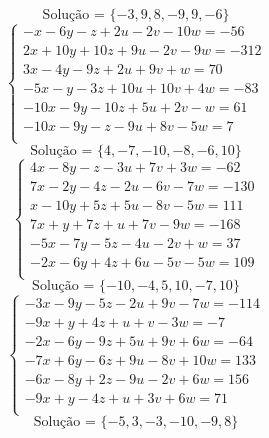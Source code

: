 \documentclass[12pt,oneside,a4paper]{article}
\begin{document}
\begin{equation*}
\text{Solução = }\{-3,9,8,-9,9,-6\}
\end{equation*}
\vspace{\baselineskip}
\begin{equation*}
\begin{cases}
-x-6y-z+2u-2v-10w=-56 \\
2x+10y+10z+9u-2v-9w=-312 \\
3x-4y-9z+2u+9v+w=70 \\
-5x-y-3z+10u+10v+4w=-83 \\
-10x-9y-10z+5u+2v-w=61 \\
-10x-9y-z-9u+8v-5w=7 \\
\end{cases}
\end{equation*}
\begin{equation*}
\text{Solução = }\{4,-7,-10,-8,-6,10\}
\end{equation*}
\vspace{\baselineskip}
\begin{equation*}
\begin{cases}
4x-8y-z-3u+7v+3w=-62 \\
7x-2y-4z-2u-6v-7w=-130 \\
x-10y+5z+5u-8v-5w=111 \\
7x+y+7z+u+7v-9w=-168 \\
-5x-7y-5z-4u-2v+w=37 \\
-2x-6y+4z+6u-5v-5w=109 \\
\end{cases}
\end{equation*}
\begin{equation*}
\text{Solução = }\{-10,-4,5,10,-7,10\}
\end{equation*}
\vspace{\baselineskip}
\begin{equation*}
\begin{cases}
-3x-9y-5z-2u+9v-7w=-114 \\
-9x+y+4z+u+v-3w=-7 \\
-2x-6y-9z+5u+9v+6w=-64 \\
-7x+6y-6z+9u-8v+10w=133 \\
-6x-8y+2z-9u-2v+6w=156 \\
-9x+y-4z+u+3v+6w=71 \\
\end{cases}
\end{equation*}
\begin{equation*}
\text{Solução = }\{-5,3,-3,-10,-9,8\}
\end{equation*}
\end{document}
